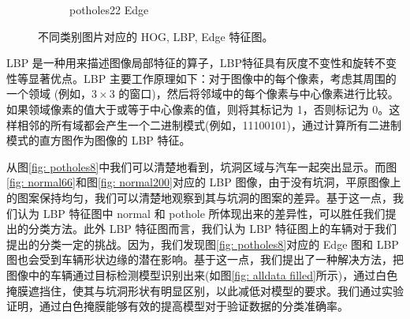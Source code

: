 \documentclass[a4paper, 10pt]{article}
\begin{document}
\begin{figure}[htbp]
\begin{subfigure}{0.24\textwidth}
			\caption*{potholes22 Edge}
			\label{fig: potholes22 Edge}
		\end{subfigure} 
		\caption{
			\label{fig: LBP and HOG}
			不同类别图片对应的 HOG, LBP, Edge 特征图。
		}
	\end{figure}
	
	LBP 是一种用来描述图像局部特征的算子，LBP特征具有灰度不变性和旋转不变性等显著优点。LBP 主要工作原理如下：对于图像中的每个像素，考虑其周围的一个领域 (例如，$3 \times 3$ 的窗口)，然后将邻域中的每个像素与中心像素进行比较。如果领域像素的值大于或等于中心像素的值，则将其标记为 1，否则标记为 0。这样相邻的所有域都会产生一个二进制模式(例如，11100101)，通过计算所有二进制模式的直方图作为图像的 LBP 特征。
	
	从图\ref{fig: potholes8}中我们可以清楚地看到，坑洞区域与汽车一起突出显示。而图\ref{fig: normal66}和图\ref{fig: normal200}对应的 LBP 图像，由于没有坑洞，平原图像上的图案保持均匀，我们可以清楚地观察到其与坑洞的图案的差异。基于这一点，我们认为 LBP 特征图中 normal 和 pothole 所体现出来的差异性，可以胜任我们提出的分类方法。此外 LBP 特征图而言，我们认为 LBP 特征图上的车辆对于我们提出的分类一定的挑战。因为，我们发现图\ref{fig: potholes8}对应的 Edge 图和 LBP 图也会受到车辆形状边缘的潜在影响。基于这一点，我们提出了一种解决方法，把图像中的车辆通过目标检测模型识别出来(如图\ref{fig: alldata filled}所示)，通过白色掩膜遮挡住，使其与坑洞形状有明显区别，以此减低对模型的要求。我们通过实验证明，通过白色掩膜能够有效的提高模型对于验证数据的分类准确率。
	
\end{document}

